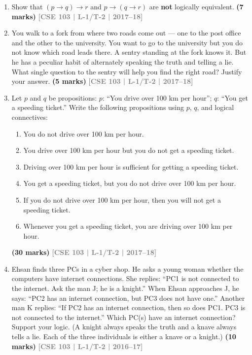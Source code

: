 \documentclass[12pt,a3paper]{article}
\newcommand{\yr}[1]{\hfill\textcolor{gray}{\small\textbf{[#1]}}}
\newcommand{\mk}[1]{\textcolor{orange!70!black}{\small\textbf{(#1 marks)}}}
\begin{document}
\begin{enumerate}
\item Show that $(p \to q) \to r$ and $p \to (q \to r)$ are \textbf{not} logically equivalent.
\mk{7} \yr{CSE 103 | L-1/T-2 | 2017--18}

\item You walk to a fork from where two roads come out — one to the post office and the other to the university. You want to go to the university but you do not know which road leads there. A sentry standing at the fork knows it. But he has a peculiar habit of alternately speaking the truth and telling a lie. What single question to the sentry will help you find the right road? Justify your answer.
\mk{5} \yr{CSE 103 | L-1/T-2 | 2017--18}

\item Let $p$ and $q$ be propositions: $p$: ``You drive over 100 km per hour''; $q$: ``You get a speeding ticket.'' Write the following propositions using $p$, $q$, and logical connectives:
\begin{enumerate}
  \item You do not drive over 100 km per hour.
  \item You drive over 100 km per hour but you do not get a speeding ticket.
  \item Driving over 100 km per hour is sufficient for getting a speeding ticket.
  \item You get a speeding ticket, but you do not drive over 100 km per hour.
  \item If you do not drive over 100 km per hour, then you will not get a speeding ticket.
  \item Whenever you get a speeding ticket, you are driving over 100 km per hour.
\end{enumerate}
\mk{30} \yr{CSE 103 | L-1/T-2 | 2017--18}  

\item Ehsan finds three PCs in a cyber shop. He asks a young woman whether the computers have internet connections. She replies: ``PC1 is not connected to the internet. Ask the man J; he is a knight.'' When Ehsan approaches J, he says: ``PC2 has an internet connection, but PC3 does not have one.'' Another man K replies: ``If PC2 has an internet connection, then so does PC1. PC3 is not connected to the internet.'' Which PC(s) have an internet connection? Support your logic. (A knight always speaks the truth and a knave always tells a lie. Each of the three individuals is either a knave or a knight.)
\mk{10} \yr{CSE 103 | L-1/T-2 | 2016--17}


\end{enumerate}
\end{document}
